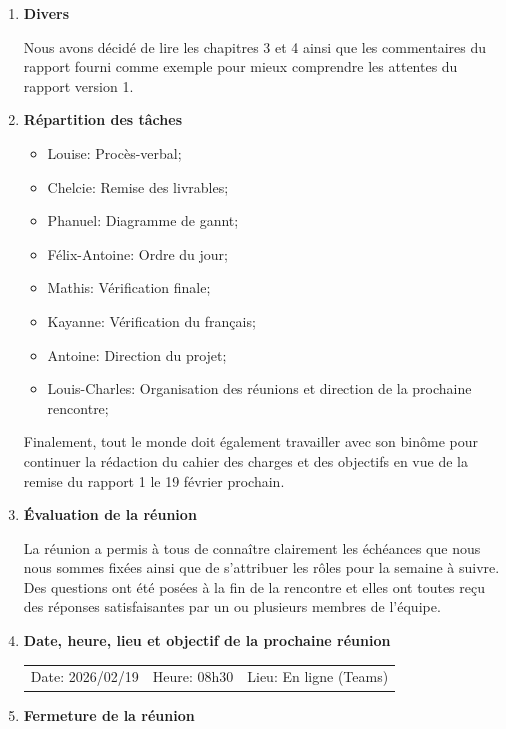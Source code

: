 \documentclass[12pt]{ULojpv}
\begin{document}
\begin{enumerate}
\begin{enumerate}
\end{enumerate}


\item \textbf{Divers}


Nous avons décidé de lire les chapitres 3 et 4 ainsi que les commentaires du rapport fourni comme exemple pour mieux comprendre les attentes du rapport version 1.

\item \textbf{Répartition des tâches}

\begin{itemize}
   \item Louise: Procès-verbal;
   \item Chelcie: Remise des livrables;
   \item Phanuel: Diagramme de gannt;
   \item Félix-Antoine: Ordre du jour;
   \item Mathis: Vérification finale;
   \item Kayanne: Vérification du français;
   \item Antoine: Direction du projet;
   \item Louis-Charles: Organisation des réunions et direction de la prochaine rencontre;
\end{itemize}

Finalement, tout le monde doit également travailler avec son binôme pour continuer la rédaction du cahier des charges et des objectifs  en vue de la remise du rapport 1 le 19 février prochain.



\item \textbf{Évaluation de la réunion}

La réunion a permis à tous de connaître clairement les échéances que nous nous sommes fixées ainsi que de
s'attribuer les rôles pour la semaine à suivre. Des questions ont été posées à la fin de la rencontre et elles ont
toutes reçu des réponses satisfaisantes par un ou plusieurs membres de l'équipe.

\item \textbf{Date, heure, lieu et objectif de la prochaine réunion}

\begin{tabular}{@{}lll}
   Date: 2026/02/19
   & Heure: 08h30
   &  Lieu: En ligne (Teams)
\end{tabular}


\item \textbf{Fermeture de la réunion}


\end{enumerate}
\end{document}
